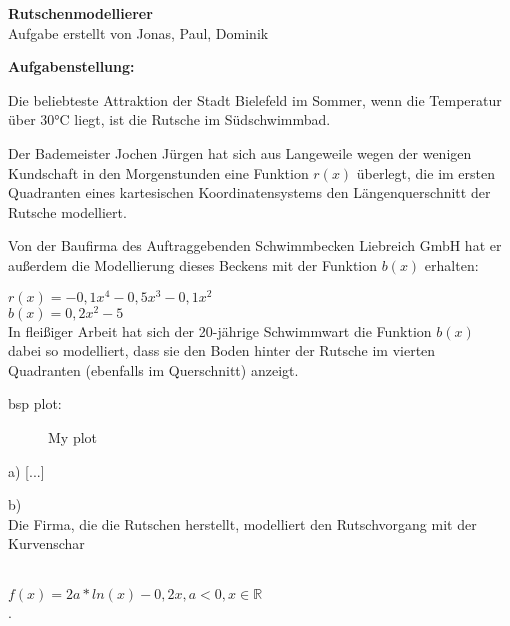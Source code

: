 \documentclass{article}
\begin{document}
\begin{center}
    \huge \textbf{Rutschenmodellierer}\\
    \footnotesize{Aufgabe erstellt von Jonas, Paul, Dominik}
\end{center}

\vspace{1.5cm}

\textbf{Aufgabenstellung:}

\vspace{0.2cm}

Die beliebteste Attraktion der Stadt Bielefeld im Sommer, wenn die Temperatur über 30°C liegt, ist die Rutsche im Südschwimmbad.

Der Bademeister Jochen Jürgen hat sich aus Langeweile wegen der wenigen Kundschaft in den Morgenstunden eine Funktion $r(x)$ überlegt, die im ersten Quadranten eines kartesischen Koordinatensystems den Längenquerschnitt der Rutsche modelliert. 

Von der Baufirma des Auftraggebenden Schwimmbecken Liebreich GmbH hat er außerdem die Modellierung dieses Beckens mit der Funktion $b(x)$ erhalten:\\

\vspace{0.2cm}

$r(x) = -0,1x^4 - 0,5x^3 - 0,1x^2$ \\

$b(x) = 0,2x^2 - 5$\\

In fleißiger Arbeit hat sich der 20-jährige Schwimmwart die Funktion $b(x)$ dabei so modelliert, dass sie den Boden hinter der Rutsche im vierten Quadranten (ebenfalls im Querschnitt) anzeigt.

\vspace{2cm}

bsp plot:\\
\begin{figure}[h]
    \centering
{}

\caption{My plot}
    \label{fig:myplot}
\end{figure}

a) [...]
\vspace{1cm}

b)\\

Die Firma, die die Rutschen herstellt, modelliert den Rutschvorgang mit der Kurvenschar

\vspace{0.2cm}

\\ $f(x) = 2a * ln(x) - 0,2x, a < 0, x 	\in \mathbb{R}$ \\.
\end{document}
